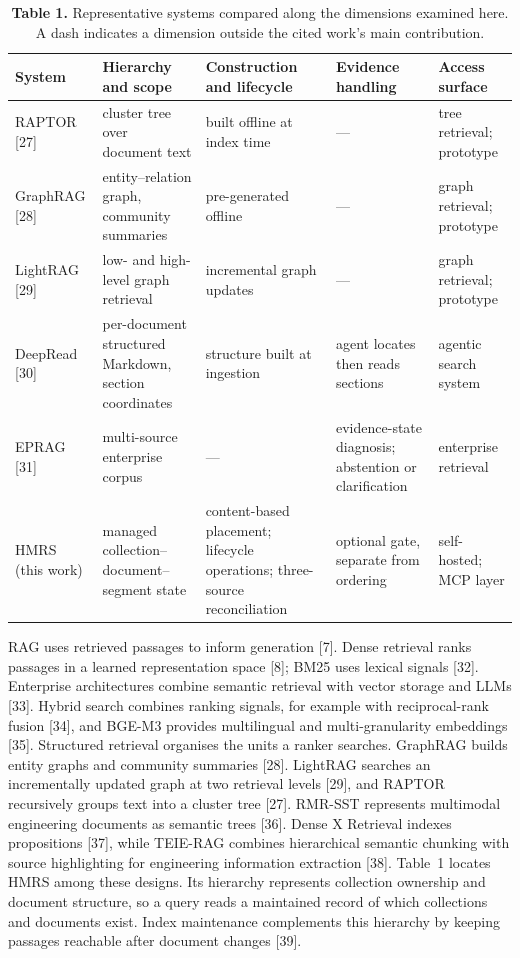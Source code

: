 \begin{table}
\centering
\small
\setlength{\tabcolsep}{3.5pt}
\renewcommand{\arraystretch}{1.02}
\caption{\textbf{Table 1.} Representative systems compared along the dimensions examined here.
A dash indicates a dimension outside the cited work's main contribution.}

\begin{tabular}{@{}p{2.145cm}p{4.042cm}p{3.465cm}p{3.547cm}p{2.145cm}@{}}
\toprule
System & Hierarchy and scope & Construction and lifecycle & Evidence handling & Access surface\\
\midrule
RAPTOR [27] & cluster tree over document text & built offline at index time & --- & tree retrieval; prototype\\
GraphRAG [28] & entity--relation graph, community summaries & pre-generated offline & --- & graph retrieval; prototype\\
LightRAG [29] & low- and high-level graph retrieval & incremental graph updates & --- & graph retrieval; prototype\\
DeepRead [30] & per-document structured Markdown, section coordinates & structure built at ingestion & agent locates then reads sections & agentic search system\\
EPRAG [31] & multi-source enterprise corpus & --- & evidence-state diagnosis; abstention or clarification & enterprise retrieval\\
HMRS (this work) & managed collection--document--segment state & content-based placement; lifecycle operations; three-source reconciliation & optional gate, separate from ordering & self-hosted; MCP layer\\
\bottomrule
\end{tabular}
\end{table}

RAG uses retrieved passages to inform generation [7]. Dense
retrieval ranks passages in a learned representation space [8]; BM25
uses lexical signals [32]. Enterprise architectures combine semantic
retrieval with vector storage and LLMs [33].
Hybrid search combines ranking signals, for example with reciprocal-rank
fusion [34], and BGE-M3 provides multilingual and
multi-granularity embeddings [35]. Structured retrieval organises
the units a ranker searches. GraphRAG builds entity graphs and community
summaries [28]. LightRAG searches an incrementally updated
graph at two retrieval levels [29], and RAPTOR recursively
groups text into a cluster tree [27]. RMR-SST represents multimodal engineering
documents as semantic trees [36]. Dense X Retrieval
indexes propositions [37], while TEIE-RAG combines
hierarchical semantic chunking with source highlighting for engineering
information extraction [38].
Table~1 locates HMRS among these designs. Its
hierarchy represents collection ownership and document structure, so a
query reads a maintained record of which collections and documents exist.
Index maintenance complements this hierarchy by keeping passages reachable
after document changes [39].

